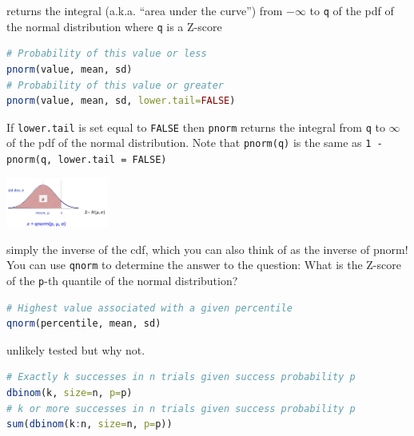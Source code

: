 \documentclass[10pt,landscape]{article}
\newcommand{\Blue}[1]{\noindent{\textbf{\textcolor{Blue}{#1 -}}}}
\newcommand{\Red}[1]{\noindent{\textbf{\textcolor{BrickRed}{#1 -}}}}
\begin{document}
\begin{multicols}{4}
\Red{\texttt{pnorm}} returns the integral (a.k.a. ``area under the curve'') from $-\infty$ to \texttt{q} of the pdf of the
normal distribution where \texttt{q} is a Z-score
\lstset{breaklines=true}
\begin{lstlisting}[language=R]
# Probability of this value or less
pnorm(value, mean, sd)
# Probability of this value or greater
pnorm(value, mean, sd, lower.tail=FALSE)
\end{lstlisting}
If \texttt{lower.tail} is set equal to \texttt{FALSE} then \texttt{pnorm} returns the integral from \texttt{q} to
$\infty$ of the pdf of the normal distribution. Note that \texttt{pnorm(q)} is the same as
\texttt{1 - pnorm(q, lower.tail = FALSE)}

\includegraphics[width=0.25\textwidth]{qnorm.jpg}

\Red{\texttt{qnorm}} simply the inverse of the cdf, which you can also think of as the inverse of pnorm! You can use
\texttt{qnorm} to determine the answer to the question: What is the Z-score of the \texttt{p}-th quantile of the normal
distribution?

\begin{lstlisting}[language=R]
# Highest value associated with a given percentile
qnorm(percentile, mean, sd)
\end{lstlisting}

\Blue{Binomial functions} unlikely tested but why not.
\begin{lstlisting}[language=R]
# Exactly k successes in n trials given success probability p
dbinom(k, size=n, p=p)
# k or more successes in n trials given success probability p
sum(dbinom(k:n, size=n, p=p))
\end{lstlisting}

\end{multicols}
\end{document}
